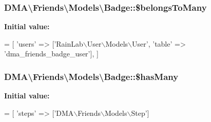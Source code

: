 \subsubsection[{\$belongs\+To\+Many}]{\setlength{\rightskip}{0pt plus 5cm}D\+M\+A\textbackslash{}\+Friends\textbackslash{}\+Models\textbackslash{}\+Badge\+::\$belongs\+To\+Many}\label{classDMA_1_1Friends_1_1Models_1_1Badge_ab143958e8f63d5b612832fee145f0aa1}
{\bfseries Initial value\+:}
\begin{DoxyCode}
= [
        \textcolor{stringliteral}{'users'} => [\textcolor{stringliteral}{'RainLab\(\backslash\)User\(\backslash\)Models\(\backslash\)User'}, \textcolor{stringliteral}{'table'} => \textcolor{stringliteral}{'dma\_friends\_badge\_user'}],
    ]
\end{DoxyCode}
\hypertarget{classDMA_1_1Friends_1_1Models_1_1Badge_a1b363de2d8c44cd12dff6bca90a6b212}{}
\subsubsection[{\$has\+Many}]{\setlength{\rightskip}{0pt plus 5cm}D\+M\+A\textbackslash{}\+Friends\textbackslash{}\+Models\textbackslash{}\+Badge\+::\$has\+Many}\label{classDMA_1_1Friends_1_1Models_1_1Badge_a1b363de2d8c44cd12dff6bca90a6b212}
{\bfseries Initial value\+:}
\begin{DoxyCode}
= [
        \textcolor{stringliteral}{'steps'} => [\textcolor{stringliteral}{'DMA\(\backslash\)Friends\(\backslash\)Models\(\backslash\)Step'}]
\end{DoxyCode}
\hypertarget{classDMA_1_1Friends_1_1Models_1_1Badge_a239fed984baad287f15badaaece428ff}{}

